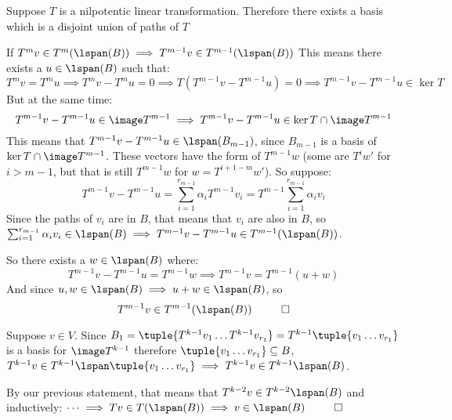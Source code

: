 \documentclass[10pt]{article}
\begin{document}
\begin{lemma}[pathBasisLemma]{Suppose $T$ is a nilpotentic linear transformation. Therefore there exists a basis which is a disjoint union of paths of $T$}
\begin{itemize}
\begin{statement}{If $T^mv\in T^m(\lspan(B))\implies T^{m-1}v\in T^{m-1}(\lspan(B))$}
    This means there exists a $u\in\lspan(B)$ such that:
    \[ T^mv=T^mu \implies T^mv-T^mu = 0 \implies T(T^{m-1}v-T^{m-1}u) = 0 \implies T^{m-1}v-T^{m-1}u\in\ker T \]
    But at the same time:
    \[ T^{m-1}v-T^{m-1}u\in\image T^{m-1} \implies T^{m-1}v-T^{m-1}u\in\ker T\cap\image T^{m-1} \]
    This means that $T^{m-1}v-T^{m-1}u\in\lspan(B_{m-1})$, since $B_{m-1}$ is a basis of $\ker T\cap\image T^{m-1}$. These vectors have the form of $T^{m-1}w$ (some are $T^iw'$ for $i>m-1$, but that is still $T^{m-1}w$ for $w=T^{i+1-m}w'$). So suppose:
    \[ T^{m-1}v-T^{m-1}u = \sum_{i=1}^{r_{m-1}} \alpha_i T^{m-1}v_i = T^{m-1} \sum_{i=1}^{r_{m-1}} \alpha_iv_i \]
    Since the paths of $v_i$ are in $B$, that means that $v_i$ are also in $B$, so $\sum_{i=1}^{r_{m-1}} \alpha_iv_i\in\lspan(B)\implies T^{m-1}v-T^{m-1}u\in T^{m-1}(\lspan(B))$.
    
    So there exists a $w\in\lspan(B)$ where:
    \[ T^{m-1}v-T^{m-1}u = T^{m-1}w \implies T^{m-1}v = T^{m-1}(u+w) \]
    And since $u,w\in\lspan(B)\implies u+w\in\lspan(B)$, so
    \[ T^{m-1}v\in T^{m-1}(\lspan(B)) ~~ \qed \]
    
    \end{statement}
    
    Suppose $v\in V$. Since $B_1=\tuple{T^{k-1}v_1\dots T^{k-1}v_{r_1}}=T^{k-1}\tuple{v_1\dots v_{r_1}}$ is a basis for $\image T^{k-1}$ therefore $\tuple{v_1\dots v_{r_1}}\subseteq B$, $T^{k-1}v\in T^{k-1}\lspan\tuple{v_1\dots v_{r_1}}\implies T^{k-1}v\in T^{k-1}\lspan(B)$.
    
    By our previous statement, that means that $T^{k-2}v\in T^{k-2}\lspan(B)$ and inductively: $\cdots\implies Tv\in T(\lspan(B))\implies v\in\lspan(B) ~~ \qed$

\end{itemize}

\end{lemma}   
    
\end{document}
